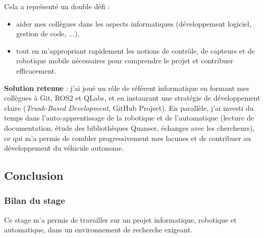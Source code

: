 \documentclass{name}
\begin{document}
Cela a représenté un double défi :

\begin{itemize}
    \item aider mes collègues dans les aspects informatiques (développement logiciel, gestion de code, ...),
    \item tout en m'appropriant rapidement les notions de contrôle, de capteurs et de robotique mobile nécessaires pour comprendre le projet et contribuer efficacement.
\end{itemize}

\textbf{Solution retenue} : j'ai joué un rôle de référent informatique en formant mes collègues à Git, ROS2 et QLabs, et en instaurant une stratégie de développement claire (\textit{Trunk-Based Development}, GitHub Project). En parallèle, j'ai investi du temps dans l'auto-apprentissage de la robotique et de l'automatique (lecture de documentation, étude des bibliothèques Quanser, échanges avec les chercheurs), ce qui m'a permis de combler progressivement mes lacunes et de contribuer au développement du véhicule autonome.

\newpage

\subsection{Conclusion}

\subsubsection{Bilan du stage}

Ce stage m'a permis de travailler sur un projet informatique, robotique et automatique, dans un environnement de recherche exigeant.
\end{document}
